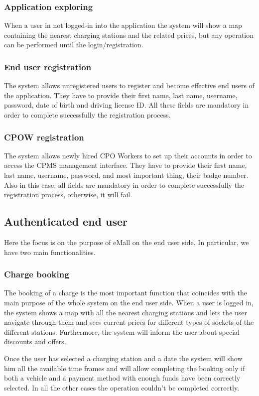 \documentclass[a4paper]{report}
\begin{document}
\subsubsection{Application exploring}
When a user in not logged-in into the application the system will show a map containing the nearest charging stations and the related prices, but any operation can be performed until the login/registration. 

\subsubsection{End user registration}
The system allows unregistered users to register and become effective end users of the application. They have to provide their first name, last name, username, password, date of birth and driving license ID. All these fields are mandatory in order to complete successfully the registration process.

\subsubsection{CPOW registration}
The system allows newly hired CPO Workers to set up their accounts in order to access the CPMS management interface. They have to provide their first name, last name, username, password, and most important thing, their badge number. Also in this case, all fields are mandatory in order to complete successfully the registration process, otherwise, it will fail.

\subsection{Authenticated end user}
Here the focus is on the purpose of eMall on the end user side. In particular, we have two main functionalities.
\subsubsection{Charge booking}
The booking of a charge is the most important function that coincides with the main purpose of the whole system on the end user side. When a user is logged in, the system shows a map with all the nearest charging stations and lets the user navigate through them and sees current prices for different types of sockets of the different stations. Furthermore, the system will inform the user about special discounts and offers.

Once the user has selected a charging station and a date the system will show him all the available time frames and will allow completing the booking only if both a vehicle and a payment method with enough funds have been correctly selected. In all the other cases the operation couldn't be completed correctly.
\end{document}
